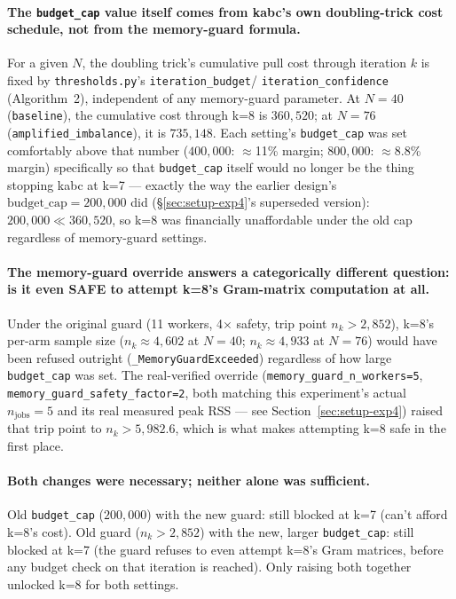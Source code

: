 \documentclass[11pt]{article}
\begin{document}
\paragraph{The \texttt{budget\_cap} value itself comes from kabc's own
doubling-trick cost schedule, not from the memory-guard formula.} For a
given $N$, the doubling trick's cumulative pull cost through iteration $k$
is fixed by \texttt{thresholds.py}'s \texttt{iteration\_budget}/
\texttt{iteration\_confidence} (Algorithm~2), independent of any
memory-guard parameter. At $N{=}40$ (\texttt{baseline}), the cumulative
cost through k=8 is $360{,}520$; at $N{=}76$
(\texttt{amplified\_imbalance}), it is $735{,}148$. Each setting's
\texttt{budget\_cap} was set comfortably above that number ($400{,}000$:
$\approx$11\% margin; $800{,}000$: $\approx$8.8\% margin) specifically so
that \texttt{budget\_cap} itself would no longer be the thing stopping
kabc at k=7 --- exactly the way the earlier design's
$\text{budget\_cap}=200{,}000$ did (\S\ref{sec:setup-exp4}'s superseded
version): $200{,}000 \ll 360{,}520$, so k=8 was financially unaffordable
under the old cap regardless of memory-guard settings.

\paragraph{The memory-guard override answers a categorically different
question: is it even SAFE to attempt k=8's Gram-matrix computation at
all.} Under the original guard (11 workers, 4$\times$ safety, trip point
$n_k>2{,}852$), k=8's per-arm sample size ($n_k{\approx}4{,}602$ at
$N{=}40$; $n_k{\approx}4{,}933$ at $N{=}76$) would have been refused
outright (\texttt{\_MemoryGuardExceeded}) regardless of how large
\texttt{budget\_cap} was set. The real-verified override
(\texttt{memory\_guard\_n\_workers=5},
\texttt{memory\_guard\_safety\_factor=2}, both matching this experiment's
actual $n_{\text{jobs}}{=}5$ and its real measured peak RSS --- see
Section~\ref{sec:setup-exp4}) raised that trip point to $n_k>5{,}982.6$,
which is what makes attempting k=8 safe in the first place.

\paragraph{Both changes were necessary; neither alone was sufficient.}
Old \texttt{budget\_cap} ($200{,}000$) with the new guard: still blocked
at k=7 (can't afford k=8's cost). Old guard ($n_k>2{,}852$) with the new,
larger \texttt{budget\_cap}: still blocked at k=7 (the guard refuses to
even attempt k=8's Gram matrices, before any budget check on that
iteration is reached). Only raising both together unlocked k=8 for both
settings.
\end{document}
